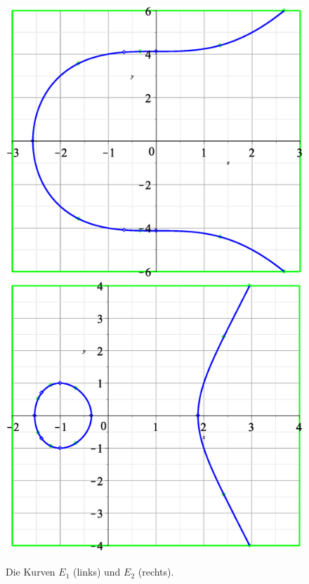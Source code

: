 \begin{figure}[h!]
	\centering
	\includegraphics[scale=.3]{img/curve_0_1.eps} \hspace{2cm}
	\includegraphics[scale=.3]{img/curve_0_2.eps}
	\caption{Die Kurven $E_1$ (links) und $E_2$ (rechts).}
\end{figure}

